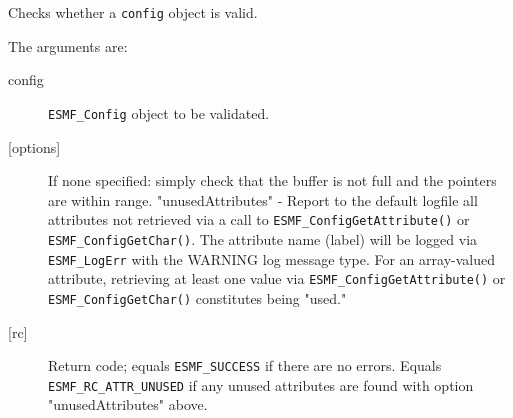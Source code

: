  
     Checks whether a {\tt config} object is valid.
  
     The arguments are:
     \begin{description}
     \item [config]
       {\tt ESMF\_Config} object to be validated.
     \item[{[options]}]
       \begin{sloppypar}
       If none specified:  simply check that the buffer is not full and the
         pointers are within range.
       "unusedAttributes" - Report to the default logfile all attributes not
         retrieved via a call to {\tt ESMF\_ConfigGetAttribute()} or
         {\tt ESMF\_ConfigGetChar()}.  The attribute name (label) will be
         logged via {\tt ESMF\_LogErr} with the WARNING log message type.
         For an array-valued attribute, retrieving at least one value via
         {\tt ESMF\_ConfigGetAttribute()} or {\tt ESMF\_ConfigGetChar()}
         constitutes being "used."
       \end{sloppypar}
     \item [{[rc]}]
       Return code; equals {\tt ESMF\_SUCCESS} if there are no errors.
       Equals {\tt ESMF\_RC\_ATTR\_UNUSED} if any unused attributes are found
       with option "unusedAttributes" above.
     \end{description}
 
\setlength{\parskip}{\oldparskip}
\setlength{\parindent}{\oldparindent}
\setlength{\baselineskip}{\oldbaselineskip}
